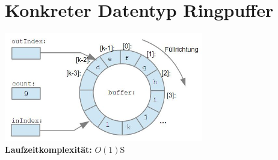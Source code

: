 \documentclass{scrreprt}
\begin{document}
\section{Konkreter Datentyp Ringpuffer}
\includegraphics[width=0.65\textwidth]{graphics/Ringpuffer}
\\\textbf{Laufzeitkomplexität:} $O(1)$S
\end{document}
